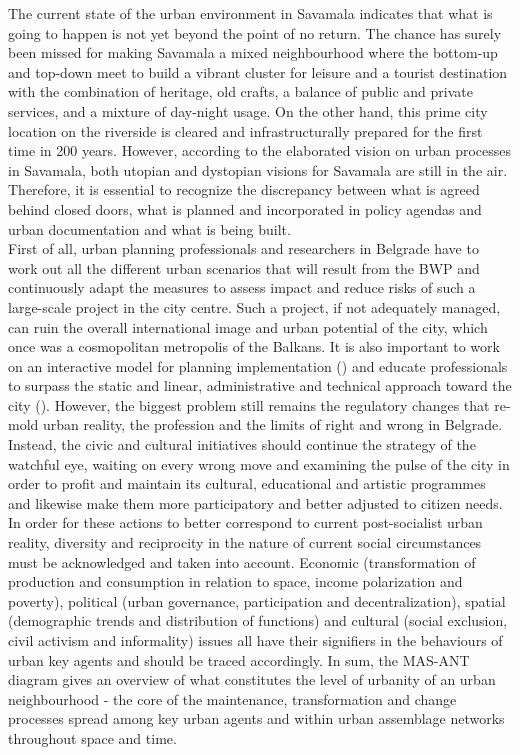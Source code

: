 \documentclass[11pt]{report}
\begin{document}
{{{The current state of the urban environment in Savamala indicates that what is going to happen is not yet beyond the point of no return. The chance has surely been missed for making Savamala a mixed neighbourhood where the bottom-up and top-down meet to build a vibrant cluster for leisure and a tourist destination with the combination of heritage, old crafts, a balance of public and private services, and a mixture of day-night usage. On the other hand, this prime city location on the riverside is cleared and infrastructurally prepared for the first time in 200 years. However, according to the elaborated vision on urban processes in Savamala, both utopian and dystopian visions for Savamala are still in the air. Therefore, it is essential to recognize the discrepancy between what is agreed behind closed doors, what is planned and incorporated in policy agendas and urban documentation and what is being built.
\\

First of all, urban planning professionals and researchers in Belgrade have to work out all the different urban scenarios that will result from the BWP and continuously adapt the measures to assess impact and reduce risks of such a large-scale project in the city centre. Such a project, if not adequately managed, can ruin the overall international image and urban potential of the city, which once was a cosmopolitan metropolis of the Balkans. It is also important to work on an interactive model for planning implementation (\href{Alexander}{\citealt{alexander_planning_1989}}) and educate professionals to surpass the static and linear, administrative and technical approach toward the city (\href{Stojkov}{\citealt{stojkov_teorijska_2012}}).
However, the biggest problem still remains the regulatory changes that re-mold urban reality, the profession and the limits of right and wrong in Belgrade. Instead, the civic and cultural initiatives should continue the strategy of the watchful eye, waiting on every wrong move and examining the pulse of the city in order to profit and maintain its cultural, educational and artistic programmes and likewise make them more participatory and better adjusted to citizen needs.
\\

In order for these actions to better correspond to current post-socialist urban reality, diversity and reciprocity in the nature of current social circumstances must be acknowledged and taken into account. Economic (transformation of production and consumption in relation to space, income polarization and poverty), political (urban governance, participation and decentralization), spatial (demographic trends and distribution of functions) and cultural (social exclusion, civil activism and informality) issues all have their signifiers in the behaviours of urban key agents and should be traced accordingly. In sum, the MAS-ANT diagram gives an overview of what constitutes the level of urbanity of an urban neighbourhood - the core of the maintenance, transformation and change processes spread among key urban agents and within urban assemblage networks throughout space and time.

}}}
\end{document}
